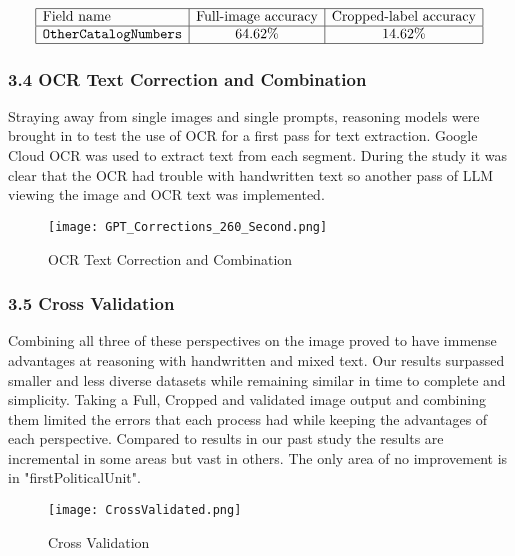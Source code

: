 \documentclass{article}
\begin{document}
$$
\begin{array}{|l|c|c|}
\hline
\text{Field name} & \text{Full-image accuracy} & \text{Cropped-label accuracy} \\
\hline
\texttt{OtherCatalogNumbers} & 64.62\% & 14.62\% \\
\hline
\end{array}
$$


\subsubsection*{3.4 OCR Text Correction and Combination}
Straying away from single images and single prompts, reasoning models were brought in to test the use of OCR for a first pass for text extraction. Google Cloud OCR was used to extract text from each segment. During the study it was clear that the OCR had trouble with handwritten text so another pass of LLM viewing the image and OCR text was implemented.

\begin{figure}[H]  %
  \centering
  \texttt{[image: GPT\_Corrections\_260\_Second.png]}
  \caption{OCR Text Correction and Combination}
  \label{fig:enter-label}
\end{figure}

\subsubsection*{3.5 Cross Validation}
Combining all three of these perspectives on the image proved to have immense advantages at reasoning with handwritten and mixed text. Our results surpassed smaller and less diverse datasets while remaining similar in time to complete and simplicity. Taking a Full, Cropped and validated image output and combining them limited the errors that each process had while keeping the advantages of each perspective. Compared to results in our past study the results are incremental in some areas but vast in others. The only area of no improvement is in "firstPoliticalUnit". 

\begin{figure}[h!]
    \centering
    \texttt{[image: CrossValidated.png]}
    \caption{Cross Validation}
    \label{fig:enter-label}
\end{figure}
\end{document}
